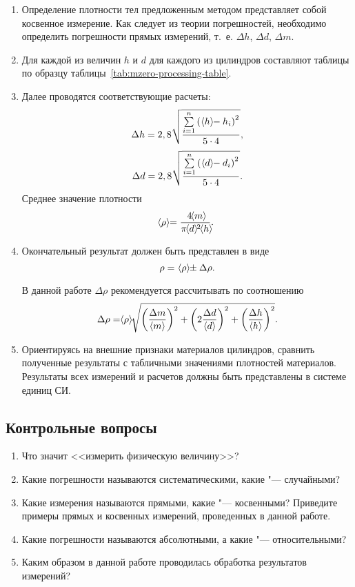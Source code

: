\documentclass[a4paper, 12pt]{extarticle}
\newcommand{\isum}{\sum\limits_{i=1}^{n}}
\begin{document}
\begin{enumerate}
\item Определение плотности тел предложенным методом представляет собой косвенное измерение. Как следует из теории погрешностей, необходимо определить погрешности прямых измерений, т.~е. $\Delta h$, $\Delta d$, $\Delta m$.

\item Для каждой из величин $h$ и $d$ для каждого из цилиндров составляют таблицы по образцу таблицы~\ref{tab:mzero-processing-table}. %

\item Далее проводятся соответствующие расчеты:
\[
    \Delta h = 2,8 \sqrt{\frac{\isum\left(\ \MTDMean{h} - h_i \right)^2}{5 \cdot 4}},
\]
\[
    \Delta d = 2,8 \sqrt{\frac{\isum\left(\ \MTDMean{d} - d_i \right)^2}{5 \cdot 4}}.
\]
Среднее значение плотности
\[
\MTDMean{\rho} = \frac{4\MTDMean{m}}{\pi \MTDMean{d}^2 \MTDMean{h}}.
\]
\item Окончательный результат должен быть представлен в виде
\[
\rho =\ \hspace{-3pt}\left<\rho\right>\hspace{-3pt} \pm \Delta \rho.
\]


В данной работе $\Delta \rho$ рекомендуется рассчитывать по соотношению
\[
\Delta \rho = \MTDMean{\rho} \sqrt{\left(\frac{\Delta m}{\MTDMean{m}}\right)^2 + \left(2\frac{\Delta d}{\MTDMean{d}}\right)^2 + \left(\frac{\Delta h}{\MTDMean{h}}\right)^2}.
\]

\item Ориентируясь на внешние признаки материалов цилиндров, сравнить полученные результаты с табличными значениями плотностей материалов. Результаты всех измерений и расчетов должны быть представлены в системе единиц СИ.
\end{enumerate}

\subsection{Контрольные вопросы}
\begin{enumerate}
\item Что значит <<измерить физическую величину>>?
\item Какие погрешности называются систематическими, какие "--- случайными?
\item Какие измерения называются прямыми, какие "--- косвенными? Приведите примеры прямых и косвенных измерений,  проведенных в данной работе.
\item Какие погрешности называются абсолютными, а какие "--- относительными?
\item Каким образом в данной работе проводилась обработка результатов измерений?
\end{enumerate}
\end{document}
